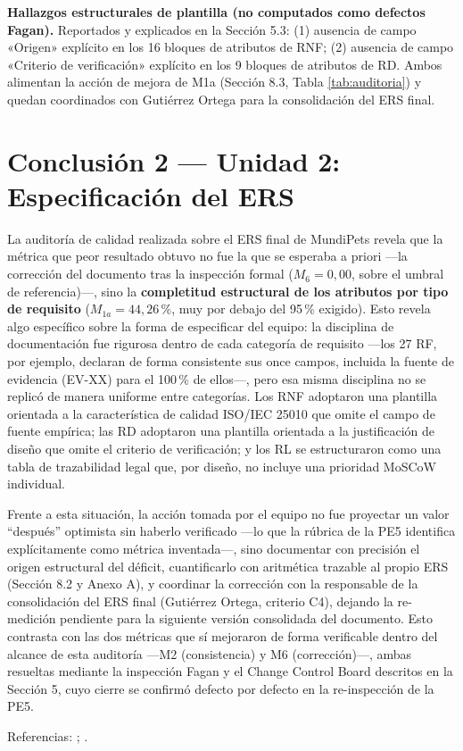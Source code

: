 \documentclass[11pt]{article}
\begin{document}
	\textbf{Hallazgos estructurales de plantilla (no computados como defectos Fagan).} Reportados y explicados en la Sección 5.3: (1) ausencia de campo «Origen» explícito en los 16 bloques de atributos de RNF; (2) ausencia de campo «Criterio de verificación» explícito en los 9 bloques de atributos de RD. Ambos alimentan la acción de mejora de M1a (Sección 8.3, Tabla \ref{tab:auditoria}) y quedan coordinados con Gutiérrez Ortega para la consolidación del ERS final.
	
	\newpage
	
	\section*{Conclusión 2 --- Unidad 2: Especificación del ERS}
	
	La auditoría de calidad realizada sobre el ERS final de MundiPets revela que la métrica que peor resultado obtuvo no fue la que se esperaba a priori ---la corrección del documento tras la inspección formal ($M_6 = 0{,}00$, sobre el umbral de referencia)---, sino la \textbf{completitud estructural de los atributos por tipo de requisito} ($M_{1a} = 44{,}26\,\%$, muy por debajo del 95\,\% exigido). Esto revela algo específico sobre la forma de especificar del equipo: la disciplina de documentación fue rigurosa dentro de cada categoría de requisito ---los 27 RF, por ejemplo, declaran de forma consistente sus once campos, incluida la fuente de evidencia (EV-XX) para el 100\,\% de ellos---, pero esa misma disciplina no se replicó de manera uniforme entre categorías. Los RNF adoptaron una plantilla orientada a la característica de calidad ISO/IEC 25010 que omite el campo de fuente empírica; las RD adoptaron una plantilla orientada a la justificación de diseño que omite el criterio de verificación; y los RL se estructuraron como una tabla de trazabilidad legal que, por diseño, no incluye una prioridad MoSCoW individual.
	
	Frente a esta situación, la acción tomada por el equipo no fue proyectar un valor ``después'' optimista sin haberlo verificado ---lo que la rúbrica de la PE5 identifica explícitamente como métrica inventada---, sino documentar con precisión el origen estructural del déficit, cuantificarlo con aritmética trazable al propio ERS (Sección 8.2 y Anexo A), y coordinar la corrección con la responsable de la consolidación del ERS final (Gutiérrez Ortega, criterio C4), dejando la re-medición pendiente para la siguiente versión consolidada del documento. Esto contrasta con las dos métricas que sí mejoraron de forma verificable dentro del alcance de esta auditoría ---M2 (consistencia) y M6 (corrección)---, ambas resueltas mediante la inspección Fagan y el Change Control Board descritos en la Sección 5, cuyo cierre se confirmó defecto por defecto en la re-inspección de la PE5.
	
	Referencias: \cite{ieee29148}; \cite{iso25010}.
	
	\newpage
	\printbibliography[title={Referencias}]
	
\end{document}
